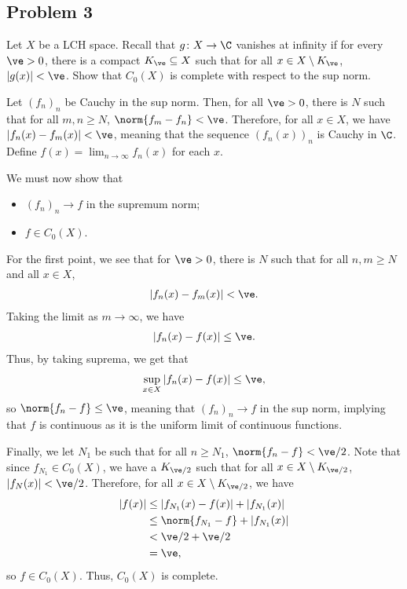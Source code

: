 \documentclass[10pt]{mypackage}
\begin{document}
\subsection{Problem 3}%
\begin{problem}
  Let $X$ be a LCH space. Recall that $g\colon X\rightarrow \C$ vanishes at infinity if for every $\ve > 0$, there is a compact $K_{\ve}\subseteq X$ such that for all $x\in X\setminus K_{\ve}$, $\left\vert g(x) \right\vert < \ve$. Show that $C_0\left( X \right)$ is complete with respect to the sup norm.
\end{problem}
Let $\left( f_n \right)_n$ be Cauchy in the sup norm. Then, for all $\ve > 0$, there is $N$ such that for all $m,n\geq N$, $\norm{f_m - f_n} < \ve$. Therefore, for all $x\in X$, we have $\left\vert f_n(x)-f_m(x) \right\vert < \ve$, meaning that the sequence $\left( f_n(x) \right)_n$ is Cauchy in $\C$. Define $f(x) = \lim_{n\rightarrow\infty}f_n(x)$ for each $x$.\newline

We must now show that
\begin{itemize}
  \item $\left( f_n \right)_n\rightarrow f$ in the supremum norm;
  \item $f\in C_0\left( X \right)$.
\end{itemize}
For the first point, we see that for $\ve > 0$, there is $N$ such that for all $n,m \geq N$ and all $x\in X$,
\begin{align*}
  \left\vert f_n(x)-f_m(x) \right\vert < \ve.
\end{align*}
Taking the limit as $m\rightarrow\infty$, we have 
\begin{align*}
  \left\vert f_n(x)-f(x) \right\vert \leq \ve.
\end{align*}
Thus, by taking suprema, we get that
\begin{align*}
  \sup_{x\in X} \left\vert f_n(x)-f(x) \right\vert \leq \ve,
\end{align*}
so $\norm{f_n - f} \leq \ve$, meaning that $\left( f_n \right)_n\rightarrow f$ in the sup norm, implying that $f$ is continuous as it is the uniform limit of continuous functions.\newline

Finally, we let $N_1$ be such that for all $n\geq N_1$, $\norm{f_n - f} < \ve/2$. Note that since $f_{N_1}\in C_0\left( X \right)$, we have a $K_{\ve/2}$ such that for all $x\in X\setminus K_{\ve/2}$, $\left\vert f_N(x) \right\vert < \ve/2$. Therefore, for all $x\in X\setminus K_{\ve/2}$, we have
\begin{align*}
  \left\vert f(x) \right\vert &\leq \left\vert f_{N_1}(x)-f(x) \right\vert + \left\vert f_{N_1}(x) \right\vert\\
                              &\leq \norm{f_{N_1} - f} + \left\vert f_{N_1}(x) \right\vert\\
                              &< \ve/2 + \ve/2\\
                              &= \ve,
\end{align*}
so $f\in C_0\left( X \right)$. Thus, $C_0\left( X \right)$ is complete.
\end{document}
